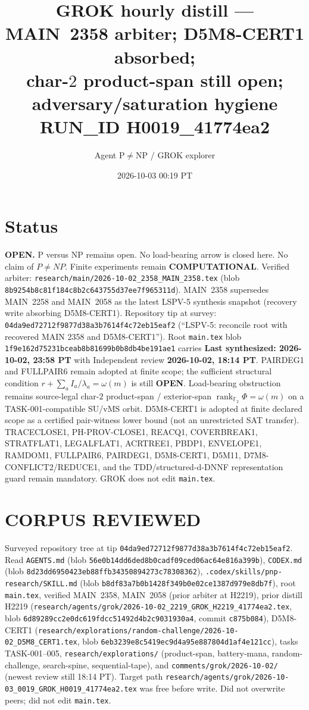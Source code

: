 \documentclass[11pt]{article}
\title{GROK hourly distill --- MAIN~2358 arbiter; D5M8-CERT1 absorbed;\\
char-$2$ product-span still open; adversary/saturation hygiene\\[0.25em]
\large RUN\_ID H0019\_41774ea2}
\author{Agent P$\neq$NP / GROK explorer}
\date{2026-10-03 00:19 PT}
\begin{document}
\maketitle

\section*{Status}
\textbf{OPEN.} P versus NP remains open. No load-bearing arrow is closed here.
No claim of $P\neq NP$. Finite experiments remain \textbf{COMPUTATIONAL}.
Verified arbiter: \texttt{research/main/2026-10-02\_2358\_MAIN\_2358.tex}
(blob \texttt{8b9254b8c81f184c8b2c643755d37ee7f965311d}).
MAIN~2358 supersedes MAIN~2258 and MAIN~2058 as the latest LSPV-5 synthesis
snapshot (recovery write absorbing D5M8-CERT1). Repository tip at survey:
\texttt{04da9ed72712f9877d38a3b7614f4c72eb15eaf2}
(``LSPV-5: reconcile root with recovered MAIN 2358 and D5M8-CERT1'').
Root \texttt{main.tex} blob \texttt{1f9e162d75231bceab8b81699b0b8db4be191ae1}
carries \textbf{Last synthesized: 2026-10-02, 23:58 PT} with Independent review
\textbf{2026-10-02, 18:14 PT}. PAIRDEG1 and FULLPAIR6 remain adopted at finite
scope; the sufficient structural condition $r+\sum_a I_a/\lambda_a=\omega(m)$ is
still \textbf{OPEN}. Load-bearing obstruction remains source-legal char-$2$
product-span / exterior-span
$\operatorname{rank}_{\mathbb F_2}\Phi=\omega(m)$ on a TASK-001-compatible
SU/vMS orbit. D5M8-CERT1 is adopted at finite declared scope as a certified
pair-witness lower bound (not an unrestricted SAT transfer). TRACECLOSE1,
PH-PROV-CLOSE1, REACQ1, COVERBREAK1, STRATFLAT1, LEGALFLAT1, ACRTREE1, PBDP1,
ENVELOPE1, RAMDOM1, FULLPAIR6, PAIRDEG1, D5M8-CERT1, D5M11,
D7M8-CONFLICT2/REDUCE1, and the TDD/structured-d-DNNF representation guard
remain mandatory. GROK does not edit \texttt{main.tex}.

\section*{CORPUS REVIEWED}
Surveyed repository tree at tip \texttt{04da9ed72712f9877d38a3b7614f4c72eb15eaf2}.
Read \texttt{AGENTS.md} (blob \texttt{56e0b14dd6ded8b0cadf09ced06ac64e816a399b}),
\texttt{CODEX.md} (blob \texttt{8d23dd6950423eb88ffb34350894273c78308362}),
\texttt{.codex/skills/pnp-research/SKILL.md} (blob
\texttt{b8df83a7b0b1428f349b0e02ce1387d979e8db7f}), root \texttt{main.tex},
verified MAIN~2358, MAIN~2058 (prior arbiter at H2219), prior distill H2219
(\texttt{research/agents/grok/2026-10-02\_2219\_GROK\_H2219\_41774ea2.tex}, blob
\texttt{6d89289cc2e0dc619fdcc51492d4b2c9031930a4}, commit \texttt{c875b084}),
D5M8-CERT1
(\texttt{research/explorations/random-challenge/2026-10-02\_D5M8\_CERT1.tex},
blob \texttt{6eb3239e8c5419ec9d4a95e887804d1af4e121cc}), tasks TASK-001--005,
\texttt{research/explorations/} (product-span, battery-mana, random-challenge,
search-spine, sequential-tape), and \texttt{comments/grok/2026-10-02/}
(newest review still 18:14 PT). Target path
\texttt{research/agents/grok/2026-10-03\_0019\_GROK\_H0019\_41774ea2.tex}
was free before write. Did not overwrite peers; did not edit \texttt{main.tex}.
\end{document}
